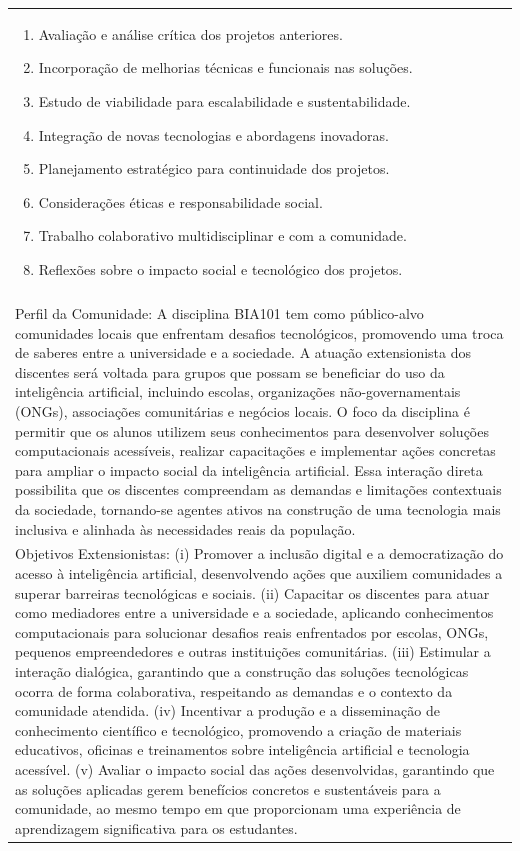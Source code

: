 \documentclass[11pt]{article}
\begin{document}
\begin{center}
\begin{longtable}{|p{4cm}|p{4cm}|p{4cm}|p{4cm}|}
{\begin{enumerate}
\item Avaliação e análise crítica dos projetos anteriores.
\item Incorporação de melhorias técnicas e funcionais nas soluções.
\item Estudo de viabilidade para escalabilidade e sustentabilidade.
\item Integração de novas tecnologias e abordagens inovadoras.
\item Planejamento estratégico para continuidade dos projetos.
\item Considerações éticas e responsabilidade social.
\item Trabalho colaborativo multidisciplinar e com a comunidade.
\item Reflexões sobre o impacto social e tecnológico dos projetos.\end{enumerate}}\\
\multicolumn{4}{|p{16cm}|}{}\\
\multicolumn{4}{|p{16cm}|}{Perfil da Comunidade: A disciplina BIA101 tem como público-alvo comunidades locais que enfrentam desafios tecnológicos, promovendo uma troca de saberes entre a universidade e a sociedade. A atuação extensionista dos discentes será voltada para grupos que possam se beneficiar do uso da inteligência artificial, incluindo escolas, organizações não-governamentais (ONGs), associações comunitárias e negócios locais. O foco da disciplina é permitir que os alunos utilizem seus conhecimentos para desenvolver soluções computacionais acessíveis, realizar capacitações e implementar ações concretas para ampliar o impacto social da inteligência artificial. Essa interação direta possibilita que os discentes compreendam as demandas e limitações contextuais da sociedade, tornando-se agentes ativos na construção de uma tecnologia mais inclusiva e alinhada às necessidades reais da população.}\\
\multicolumn{4}{|p{16cm}|}{Objetivos Extensionistas: (i) Promover a inclusão digital e a democratização do acesso à inteligência artificial, desenvolvendo ações que auxiliem comunidades a superar barreiras tecnológicas e sociais. (ii) Capacitar os discentes para atuar como mediadores entre a universidade e a sociedade, aplicando conhecimentos computacionais para solucionar desafios reais enfrentados por escolas, ONGs, pequenos empreendedores e outras instituições comunitárias. (iii) Estimular a interação dialógica, garantindo que a construção das soluções tecnológicas ocorra de forma colaborativa, respeitando as demandas e o contexto da comunidade atendida. (iv) Incentivar a produção e a disseminação de conhecimento científico e tecnológico, promovendo a criação de materiais educativos, oficinas e treinamentos sobre inteligência artificial e tecnologia acessível. (v) Avaliar o impacto social das ações desenvolvidas, garantindo que as soluções aplicadas gerem benefícios concretos e sustentáveis para a comunidade, ao mesmo tempo em que proporcionam uma experiência de aprendizagem significativa para os estudantes.}\\

\end{longtable}
\end{center}
\end{document}
